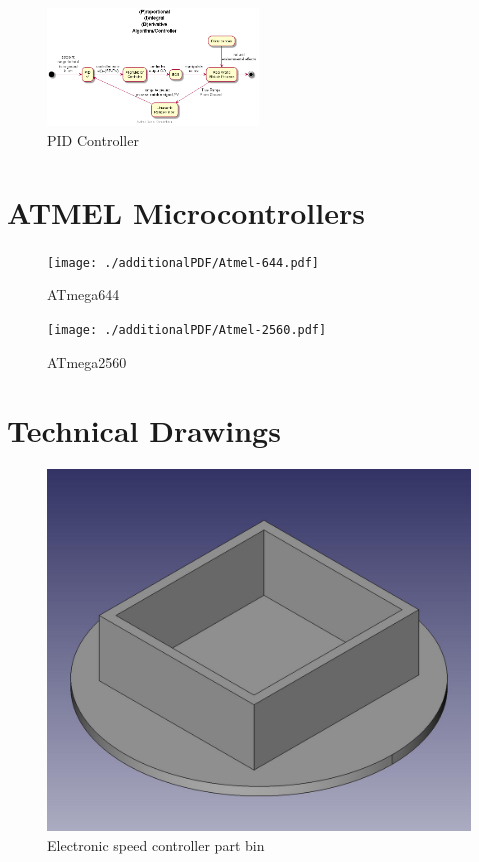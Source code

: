 \documentclass[pdftex,11pt]{article}
\begin{document}
\begin{figure}[!h]
	\centering
		\includegraphics[width=0.5\textwidth]{./plantUML/PIDloop}
	\caption{PID Controller}
	\label{fig:PIDloop}
\end{figure}

\clearpage
\section{ATMEL\textsuperscript{\textcopyright} Microcontrollers}
\label{sec:appATMEL}
\begin{figure}[!h]
	\centering
		\texttt{[image: ./additionalPDF/Atmel-644.pdf]}
	\caption{ATmega644}
	\label{fig:ATmega644}
\end{figure}

\begin{figure}[!h]
	\centering
		\texttt{[image: ./additionalPDF/Atmel-2560.pdf]}
	\caption{ATmega2560}
	\label{fig:ATmega2560}
\end{figure}

\clearpage

\section{Technical Drawings}
\label{sec:TechDraw}

\begin{figure}[!h]
	\centering
		\includegraphics[width=.5\textwidth]{./graphics/partbin.jpg}
	\caption{Electronic speed controller part bin}
	\label{fig:partbin}
\end{figure}
\end{document}
